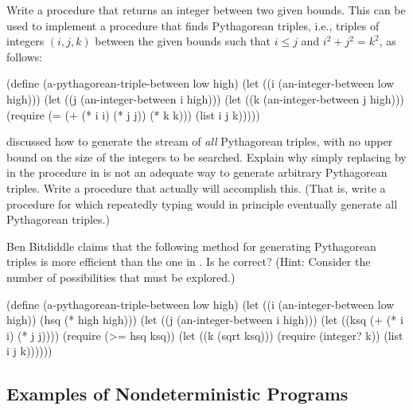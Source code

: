 \begin{exerciseGroup}
\label{Exercise 4.35}
 Write a procedure
 that returns an integer between two given bounds.
This can be used to implement a procedure that finds Pythagorean triples, i.e.,
triples of integers \( (i, j, k) \) between the given bounds such that
\( i \le j \) and \( i^2 + j^2 = k^2 \), as follows:

\begin{codeBlock}
(define (a-pythagorean-triple-between low high)
  (let ((i (an-integer-between low high)))
    (let ((j (an-integer-between i high)))
      (let ((k (an-integer-between j high)))
        (require (= (+ (* i i) (* j j)) (* k k)))
        (list i j k)))))
\end{codeBlock}

\label{Exercise 4.36}
  discussed how
to generate the stream of \emph{all} Pythagorean triples, with no upper bound
on the size of the integers to be searched.  Explain why simply replacing
 by  in the procedure
in  is not an adequate way to generate arbitrary Pythagorean
triples.  Write a procedure that actually will accomplish this.  (That is,
write a procedure for which repeatedly typing  would in
principle eventually generate all Pythagorean triples.)

\label{Exercise 4.37}
 Ben Bitdiddle claims that the
following method for generating Pythagorean triples is more efficient than the
one in .  Is he correct?  (Hint: Consider the number of
possibilities that must be explored.)

\begin{codeBlock}
(define (a-pythagorean-triple-between low high)
  (let ((i (an-integer-between low high))
        (hsq (* high high)))
    (let ((j (an-integer-between i high)))
      (let ((ksq (+ (* i i) (* j j))))
        (require (>= hsq ksq))
        (let ((k (sqrt ksq)))
          (require (integer? k))
          (list i j k))))))
\end{codeBlock}
\end{exerciseGroup}

\subsection{Examples of Nondeterministic Programs}
\label{Section 4.3.2}

